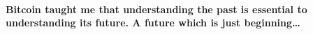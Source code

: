 \paragraph{Bitcoin taught me that understanding the past is essential to
understanding its future. A future which is just beginning\ldots}

%
%
%
%
%
